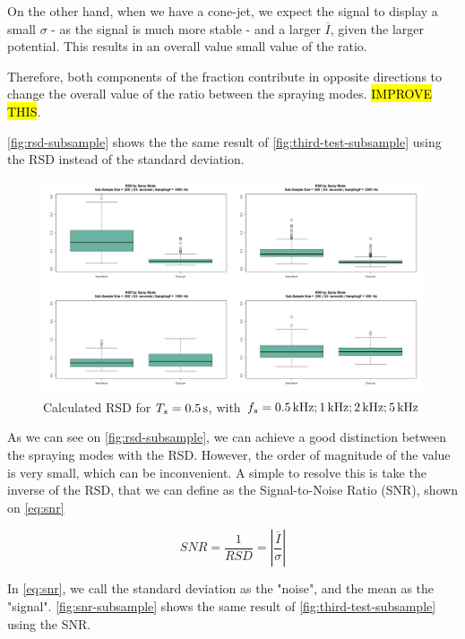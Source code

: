\documentclass[oneside,12pt]{article}
\begin{document}
On the other hand, when we have a cone-jet, we expect the signal to display a small $\sigma$ - as the signal is much more stable -
and a larger $\overline{I}$, given the larger potential. This results in an overall value small value of the ratio.

Therefore, both components of the fraction contribute in opposite directions to change the overall value of the ratio between the spraying modes.
\hl{IMPROVE THIS}.

\autoref{fig:rsd-subsample} shows the the same result of \autoref{fig:third-test-subsample} using the RSD instead of the standard deviation.

\begin{figure}[h!]
    \centering
    \includegraphics[width=\textwidth,trim=1 1 1 1,clip]{figures/rsd-subsample.png}
    \caption{Calculated RSD for $T_s = 0.5 \,\mathrm{s}$, with $f_s = 0.5 \,\mathrm{kHz}; 1 \,\mathrm{kHz}; 2 \,\mathrm{kHz}; 5 \,\mathrm{kHz}$}
    \label{fig:rsd-subsample}
\end{figure}

As we can see on \autoref{fig:rsd-subsample}, we can achieve a good distinction between the spraying modes with the RSD. However, the 
order of magnitude of the value is very small, which can be inconvenient. A simple to resolve this is take the inverse of the RSD, that 
we can define as the Signal-to-Noise Ratio (SNR), shown on \autoref{eq:snr}

\begin{equation} \label{eq:snr}
    SNR = \frac{1}{RSD} = \left|\frac{\overline{I}}{\sigma}\right|
\end{equation}

In \autoref{eq:snr}, we call the standard deviation as the "noise", and the mean as the "signal". \autoref{fig:snr-subsample} shows the
same result of \autoref{fig:third-test-subsample} using the SNR.
\end{document}
